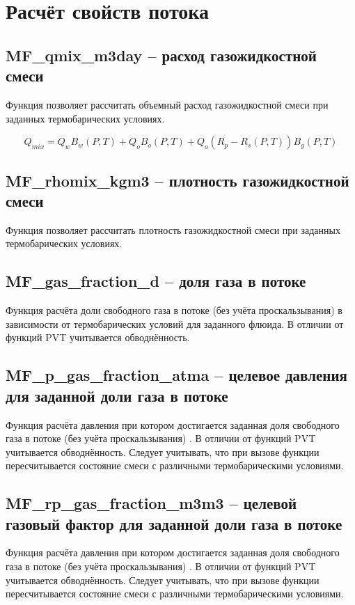 \section{Расчёт свойств потока}

\subsection{MF\_qmix\_m3day – расход газожидкостной смеси}

Функция позволяет рассчитать объемный расход газожидкостной смеси при заданных термобарических условиях. 

$$Q_{mix} = Q_w B_w(P,T) + Q_o B_o(P,T)  + Q_o  (R_p - R_s(P,T)) B_g(P,T) $$


\subsection{MF\_rhomix\_kgm3 – плотность газожидкостной смеси}

Функция позволяет рассчитать плотность газожидкостной смеси при заданных термобарических условиях. 


\subsection{MF\_gas\_fraction\_d – доля газа в потоке}
Функция расчёта доли свободного газа в потоке (без учёта проскальзывания) в зависимости от термобарических условий для заданного флюида. 
В отличии от функций PVT учитывается обводнённость.

\subsection{MF\_p\_gas\_fraction\_atma – целевое давления для заданной доли газа в потоке}
Функция расчёта давления при котором достигается заданная доля свободного газа в потоке (без учёта проскальзывания) . 
В отличии от функций PVT учитывается обводнённость.
Следует учитывать, что при вызове функции пересчитывается состояние смеси с различными термобарическими условиями.

\subsection{MF\_rp\_gas\_fraction\_m3m3 – целевой газовый фактор для заданной доли газа в потоке}
Функция расчёта давления при котором достигается заданная доля свободного газа в потоке (без учёта проскальзывания) . 
В отличии от функций PVT учитывается обводнённость.
Следует учитывать, что при вызове функции пересчитывается состояние смеси с различными термобарическими условиями.

